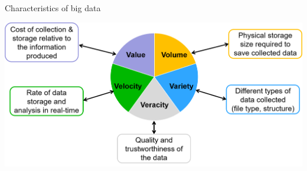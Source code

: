 \documentclass{beamer}
\begin{document}
\begin{frame}{Characteristics of big data}
\protect\hypertarget{characteristics-of-big-data}{}

\includegraphics{images/char_big_data.png}

\end{frame}
\end{document}
